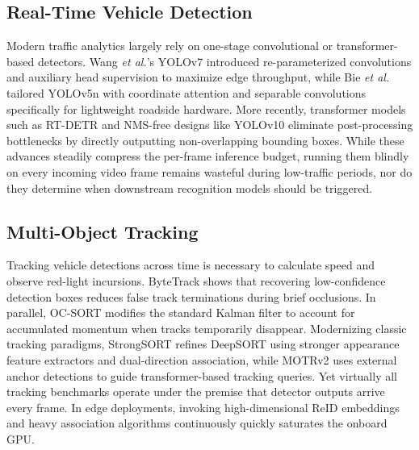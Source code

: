 \subsection{Real-Time Vehicle Detection}
Modern traffic analytics largely rely on one-stage convolutional or transformer-based detectors. Wang \emph{et al.}'s YOLOv7 \cite{wang2023yolov7} introduced re-parameterized convolutions and auxiliary head supervision to maximize edge throughput, while Bie \emph{et al.} \cite{bie2023yolov5nl} tailored YOLOv5n with coordinate attention and separable convolutions specifically for lightweight roadside hardware. More recently, transformer models such as RT-DETR \cite{zhao2024rtdetr} and NMS-free designs like YOLOv10 \cite{wang2024yolov10} eliminate post-processing bottlenecks by directly outputting non-overlapping bounding boxes. While these advances steadily compress the per-frame inference budget, running them blindly on every incoming video frame remains wasteful during low-traffic periods, nor do they determine when downstream recognition models should be triggered.

\subsection{Multi-Object Tracking}
Tracking vehicle detections across time is necessary to calculate speed and observe red-light incursions. ByteTrack \cite{zhang2022bytetrack} shows that recovering low-confidence detection boxes reduces false track terminations during brief occlusions. In parallel, OC-SORT \cite{cao2023ocsort} modifies the standard Kalman filter to account for accumulated momentum when tracks temporarily disappear. Modernizing classic tracking paradigms, StrongSORT \cite{du2023strongsort} refines DeepSORT using stronger appearance feature extractors and dual-direction association, while MOTRv2 \cite{zhang2023motrv2} uses external anchor detections to guide transformer-based tracking queries. Yet virtually all tracking benchmarks operate under the premise that detector outputs arrive every frame. In edge deployments, invoking high-dimensional ReID embeddings and heavy association algorithms continuously quickly saturates the onboard GPU.


